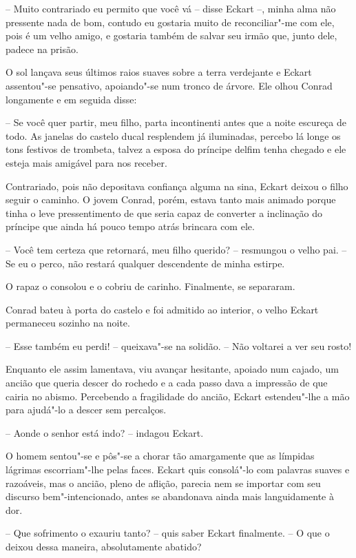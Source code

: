  -- Muito contrariado eu permito que você vá -- disse Eckart --, minha alma
não pressente nada de bom, contudo eu gostaria muito de
reconciliar"-me com ele, pois é um velho amigo, e gostaria também de
salvar seu irmão que, junto dele, padece na prisão.

  O sol lançava seus últimos raios suaves sobre a terra verdejante e
Eckart assentou"-se pensativo, apoiando"-se num tronco de árvore. Ele
olhou Conrad longamente e em seguida disse:

 -- Se você quer partir, meu filho, parta incontinenti antes que a noite
escureça de todo. As janelas do castelo ducal resplendem já iluminadas,
percebo lá longe os tons festivos de trombeta, talvez a esposa do
príncipe delfim tenha chegado e ele esteja mais amigável para nos receber.

 Contrariado, pois não depositava confiança alguma na sina, Eckart
deixou o filho seguir o caminho. O jovem Conrad, porém, estava tanto
mais animado porque tinha o leve pressentimento de que seria capaz de
converter a inclinação do príncipe que ainda há pouco tempo atrás
brincara com ele.
 
 -- Você tem certeza que retornará, meu filho querido? -- resmungou o velho
pai. -- Se eu o perco, não restará qualquer descendente de minha estirpe.

O rapaz o consolou e o cobriu de carinho. Finalmente, se separaram.

Conrad bateu à porta do castelo e foi admitido ao interior, o velho
Eckart permaneceu sozinho na noite.

-- Esse também eu perdi! -- queixava"-se na solidão. -- Não voltarei a ver seu rosto!

Enquanto ele assim lamentava, viu avançar hesitante, apoiado num cajado,
um ancião que queria descer do rochedo e a cada passo dava a impressão
de que cairia no abismo. Percebendo a fragilidade do ancião, Eckart
estendeu"-lhe a mão para ajudá"-lo a descer sem percalços.

-- Aonde o senhor está indo? -- indagou Eckart.

O homem sentou"-se e pôs"-se a chorar tão amargamente que as límpidas
lágrimas escorriam"-lhe pelas faces. Eckart quis consolá"-lo com palavras
suaves e razoáveis, mas o ancião, pleno de aflição, parecia nem se
importar com seu discurso bem"-intencionado, antes se abandonava ainda
mais languidamente à dor.

-- Que sofrimento o exauriu tanto? -- quis saber Eckart finalmente. -- O que o
deixou dessa maneira, absolutamente abatido?

